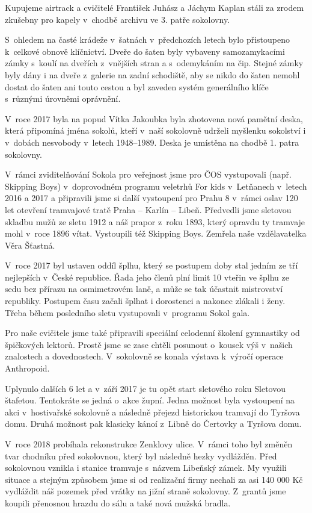 \documentclass[a5paper, 11pt, twoside]{article}
\begin{document}
Kupujeme airtrack a cvičitelé František Juhász a Jáchym Kaplan stáli za
zrodem zkušebny pro kapely v~chodbě archivu ve 3. patře sokolovny.

S~ohledem na časté krádeže v~šatnách v~předchozích letech bylo
přistoupeno k~celkové obnově klíčnictví. Dveře do šaten byly vybaveny
samozamykacími zámky s~koulí na dveřích z~vnějších stran a s~odemykáním
na čip. Stejné zámky byly dány i na dveře z~galerie na zadní schodiště,
aby se nikdo do šaten nemohl dostat do šaten ani touto cestou a byl
zaveden systém generálního klíče s~různými úrovněmi oprávnění.

V~roce 2017 byla na popud Vítka Jakoubka byla zhotovena nová pamětní
deska, která připomíná jména sokolů, kteří v~naší sokolovně udrželi
myšlenku sokolství i v~dobách nesvobody v~letech 1948--1989.
Deska je umístěna na chodbě 1. patra sokolovny.

V~rámci zviditelňování Sokola pro veřejnost jsme pro ČOS vystupovali
(např. Skipping Boys) v~doprovodném programu veletrhů For kids
v~Letňanech v~letech 2016 a 2017 a připravili jsme si další vystoupení pro
Prahu 8 v~rámci oslav 120 let otevření tramvajové tratě Praha -- Karlín
-- Libeň. Předvedli jsme sletovou skladbu mužů ze sletu 1912 a náš
prapor z~roku 1893, který opravdu ty tramvaje mohl v~roce 1896 vítat.
Vystoupili též Skipping Boys. Zemřela naše vzdělavatelka Věra Šťastná.

V~roce 2017 byl ustaven oddíl šplhu, který se postupem doby stal jedním
ze tří nejlepších v~České republice. Řada jeho členů plní limit 10
vteřin ve šplhu ze sedu bez přírazu na osmimetrovém laně, a může se tak
účastnit mistrovství republiky. Postupem času začali šplhat i dorostenci
a nakonec zlákali i ženy. Třeba během posledního sletu vystupovali
v~programu Sokol gala.

Pro naše cvičitele jsme také připravili speciální celodenní školení
gymnastiky od špičkových lektorů. Prostě jsme se zase chtěli posunout
o~kousek výš v~našich znalostech a dovednostech. V~sokolovně se konala
výstava k~výročí operace Anthropoid.

Uplynulo dalších 6 let a v~září 2017 je tu opět start sletového roku
Sletovou štafetou. Tentokráte se jedná o~akce župní. Jedna možnost byla
vystoupení na akci v~hostivařské sokolovně a následně přejezd
historickou tramvají do Tyršova domu. Druhá možnost pak klasicky kánoí
z~Libně do Čertovky a Tyršova domu.

V~roce 2018 probíhala rekonstrukce Zenklovy ulice. V~rámci toho byl
změněn tvar chodníku před sokolovnou, který byl následně hezky
vydlážděn. Před sokolovnou vznikla i stanice tramvaje s~názvem Libeňský
zámek. My využili situace a stejným způsobem jsme si od realizační firmy
nechali za asi 140 000 Kč vydláždit náš pozemek před vrátky na jižní
straně sokolovny. Z~grantů jsme koupili přenosnou hrazdu do sálu a také
nová mužská bradla.
\end{document}
